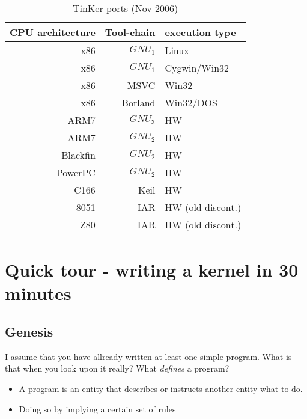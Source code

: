 \begin{table}[!hbp]
\begin{tabular}{|r|rl|}
\hline
CPU architecture 	& Tool-chain 	& execution type\\ \hline
x86 			& $GNU_1$	& Linux \\
x86 			& $GNU_1$	& Cygwin/Win32 \\
x86 			& MSVC		& Win32 \\
x86 			& Borland	& Win32/DOS \\
ARM7			& $GNU_3$	& HW\\
ARM7			& $GNU_2$	& HW\\
Blackfin		& $GNU_2$	& HW\\
PowerPC 		& $GNU_2$	& HW\\
C166 			& Keil		& HW\\
8051 			& IAR 		& HW (old discont.)\\
Z80 			& IAR 		& HW (old discont.)\\ \hline
\end{tabular}

\caption{TinKer ports (Nov 2006)}\label{ports}
\end{table}




\chapter{Quick tour - writing a kernel in 30 minutes}
\section{Genesis}
\label{kernel30}
I assume that you have allready written at least one simple program. What is that when you look upon it really? What \textit{defines} a program?

\begin{itemize}
\item A program is an entity that describes or instructs another entity what to do.
\item Doing so by implying a certain set of rules
\end{itemize}

